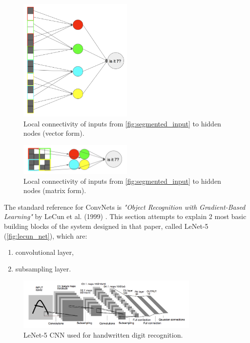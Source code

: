 \documentclass[11pt]{article}
\begin{document}
\begin{figure}[h]
\includegraphics[width=0.5\textwidth]{cnn_column}
\centering
\caption{Local connectivity of inputs from \autoref{fig:segmented_input} to hidden nodes (vector form).}
\label{fig:cnn_column}
\end{figure}

\begin{figure}[h]
\includegraphics[width=0.5\textwidth]{cnn_spacial}
\centering
\caption{Local connectivity of inputs from \autoref{fig:segmented_input} to hidden nodes (matrix form).}
\label{fig:cnn_spacial}
\end{figure}

The standard reference for ConvNets is \textit{"Object Recognition with Gradient-Based Learning"} by LeCun et al. (1999) \cite{lecun_object}. This section attempts to explain 2 most basic building blocks of the system designed in that paper, called LeNet-5 (\autoref{fig:lecun_net}), which are:
\begin{enumerate}[1)]
\item convolutional layer,
\item subsampling layer.
\end{enumerate}

\begin{figure}[h]
\includegraphics[width=0.8\textwidth]{lecun_net}
\centering
\caption{LeNet-5 CNN \cite{lecun_object} used for handwritten digit recognition.}
\label{fig:lecun_net}
\end{figure}
\end{document}
